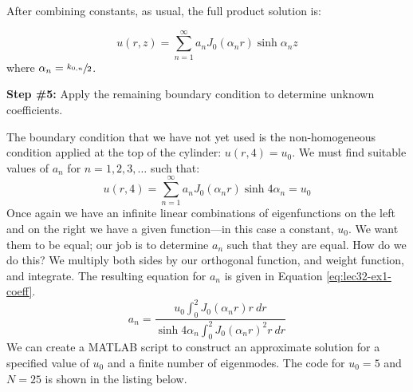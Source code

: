 \noindent After combining constants, as usual, the full product solution is:

\begin{equation}
u(r,z) = \sum\limits_{n=1}^{\infty} a_n J_0(\alpha_n r) \sinh{\alpha_n z}
\label{eq:lec32-ex1-sol}
\end{equation}
where $\alpha_n = \sfrac{k_{0,n}}{2}$.

\vspace{0.25cm}

\noindent\textbf{Step \#5:} Apply the remaining boundary condition to determine unknown coefficients.

\vspace{0.25cm}

\noindent The boundary condition that we have not yet used is the non-homogeneous condition applied at the top of the cylinder: $u(r,4) = u_0$.  We must find suitable values of $a_n$ for $n=1,2,3,\dots$ such that:
\begin{equation*}
u(r,4) = \sum\limits_{n=1}^{\infty}a_n J_0(\alpha_n r) \sinh{4\alpha_n} = u_0
\end{equation*}
Once again we have an infinite linear combinations of eigenfunctions on the left and on the right we have a given function---in this case a constant, $u_0$.  We want them to be equal; our job is to determine $a_n$ such that they are equal.  How do we do this?  We multiply both sides by our orthogonal function, and weight function, and integrate.  The resulting equation for $a_n$ is given in Equation \ref{eq:lec32-ex1-coeff}.
\begin{equation}
a_n = \frac{u_0\int_0^2 J_0(\alpha_n r)r \ dr}{\sinh{4 \alpha_n}\int_0^2 J_0(\alpha_nr)^2 r \ dr}
\label{eq:lec32-ex1-coeff}
\end{equation}
We can create a MATLAB script to construct an approximate solution for a specified value of $u_0$ and a finite number of eigenmodes.  The code for $u_0 = 5$ and $N = 25$ is shown in the listing below.
